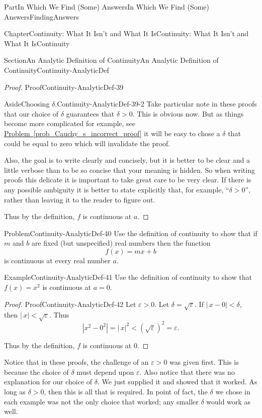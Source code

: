 \documentclass[oneside,10pt,]{book}
\newcommand{\xreffont}{\relax}
\numberwithin{equation}{part}
\newcommand{\abs}[1]{\left|#1\right|}
\newcommand{\eps}{\varepsilon}
\newcommand{\lt}{<}
\newcommand{\gt}{>}
\begin{document}
\begin{partptx}{Part}{In Which We Find (Some) Answers}{}{In Which We Find (Some) Answers}{}{}{FindingAnswers}
\begin{chapterptx}{Chapter}{Continuity: What It Isn't and What It Is}{}{Continuity: What It Isn't and What It Is}{}{}{Continuity}
\begin{sectionptx}{Section}{An Analytic Definition of Continuity}{}{An Analytic Definition of Continuity}{}{}{Continuity-AnalyticDef}
\begin{proof}{Proof}{}{Continuity-AnalyticDef-39}
\begin{aside}{Aside}{Choosing \(\delta{}\).}{Continuity-AnalyticDef-39-2}
Take particular note in these proofs that our choice of \(\delta\) guarantees that \(\delta\gt0\). This is obvious now. But as things become more complicated \textemdash{} for example, see \hyperref[prob_Cauchy_s_incorrect_proof]{Problem~{\xreffont\ref{prob_Cauchy_s_incorrect_proof}}} \textemdash{} it will be easy to chose a \(\delta\) that could be equal to zero which will invalidate the proof.%
\par
Also, the goal is to write clearly and concisely, but it is better to be clear and a little verbose than to be so concise that your meaning is hidden. So when writing proofs this delicate it is important to take great care to be very clear.  If there is any possible ambiguity it is better to state explicitly that, for example, ``\(\delta \gt
0\)'', rather than leaving it to the reader to figure out.%
\end{aside}
Thus by the definition, \(f\) is continuous at \(a\).%
\end{proof}
\begin{problem}{Problem}{}{Continuity-AnalyticDef-40}%
Use the definition of continuity to show that if \(m\) and \(b\) are fixed (but unspecified) real numbers then the function%
\begin{equation*}
f(x) = mx+b
\end{equation*}
is continuous at every real number \(a\).%
\end{problem}
\begin{example}{Example}{}{Continuity-AnalyticDef-41}%
Use the definition of continuity to show that \(f(x)=x^2\) is continuous at \(a=0\).%
\end{example}
\begin{proof}{Proof}{}{Continuity-AnalyticDef-42}
Let \(\eps>0\). Let \(\delta=\sqrt{\eps}\). If \(|\,x-0|\lt \delta\), then \(|\,x|\lt \sqrt{\eps}\). Thus%
\begin{equation*}
\abs{x^2-0^2}=|\,x|^2\lt \left(\sqrt{\eps}\right)^2=\eps\text{.}
\end{equation*}
%
\par
Thus by the definition, \(f\) is continuous at \(0\).%
\end{proof}
Notice that in these proofs, the challenge of an \(\eps>0\) was given first.  This is because the choice of \(\delta\) must depend upon \(\eps\).  Also notice that there was no explanation for our choice of \(\delta\).  We just supplied it and showed that it worked.  As long as \(\delta>0\), then this is all that is required.  In point of fact, the \(\delta\) we chose in each example was not the only choice that worked; any smaller \(\delta\) would work as well.%

\end{sectionptx}
\end{chapterptx}
\end{partptx}
\end{document}

